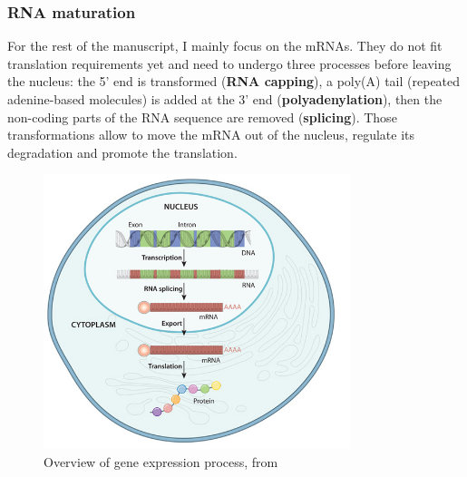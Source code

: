 \subsubsection{RNA maturation}

For the rest of the manuscript, I mainly focus on the \ac{mRNA}s.
They do not fit translation requirements yet and need to undergo three processes before leaving the nucleus: the 5' end is transformed (\textbf{\ac{RNA} capping}), a poly(A) tail (repeated adenine-based molecules) is added at the 3' end (\textbf{polyadenylation}), then the non-coding parts of the \ac{RNA} sequence are removed (\textbf{splicing}).
Those transformations allow to move the \ac{mRNA} out of the nucleus, regulate its degradation and promote the translation.

\begin{figure}[]
    \centering
    \includegraphics[width=0.8\textwidth]{figures/introduction/gene_expression_process.jpg}
    \caption[Gene expression process]{Overview of gene expression process, from~\cite{cell_essential_nature}}
    \label{fig:gene_expression}
\end{figure}



